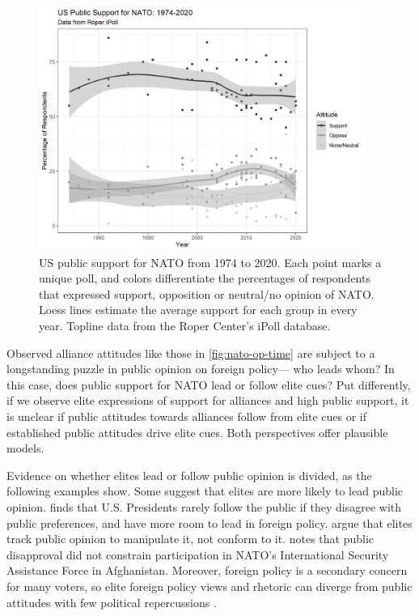\documentclass[12pt]{article}
\begin{document}
\begin{figure}
	\centering
		\includegraphics[width=0.95\textwidth]{../figures/nato-op-time.png}
	\caption{US public support for NATO from 1974 to 2020. Each point marks a unique poll, and colors differentiate the percentages of respondents that expressed support, opposition or neutral/no opinion of NATO. Loess lines estimate the average support for each group in every year. Topline data from the Roper Center's iPoll database.}
	\label{fig:nato-op-time}
\end{figure}



Observed alliance attitudes like those in \autoref{fig:nato-op-time} are subject to a longstanding puzzle in public opinion on foreign policy--- who leads whom? 
In this case, does public support for NATO lead or follow elite cues? 
Put differently, if we observe elite expressions of support for alliances and high public support, it is unclear if public attitudes towards alliances follow from elite cues or if established public attitudes drive elite cues. 
Both perspectives offer plausible models. 


Evidence on whether elites lead or follow public opinion is divided, as the following examples show.
Some suggest that elites are more likely to lead public opinion. 
\citet{Canes-Wrone2006} finds that U.S. Presidents rarely follow the public if they disagree with public preferences, and have more room to lead in foreign policy. 
\citet{JacobsShapiro2000} argue that elites track public opinion to manipulate it, not conform to it. 
\citet{Kreps2010} notes that public disapproval did not constrain participation in NATO's International Security Assistance Force in Afghanistan. 
Moreover, foreign policy is a secondary concern for many voters, so elite foreign policy views and rhetoric can diverge from public attitudes with few political repercussions \citep{BusbyMonten2012}. 
\end{document}
